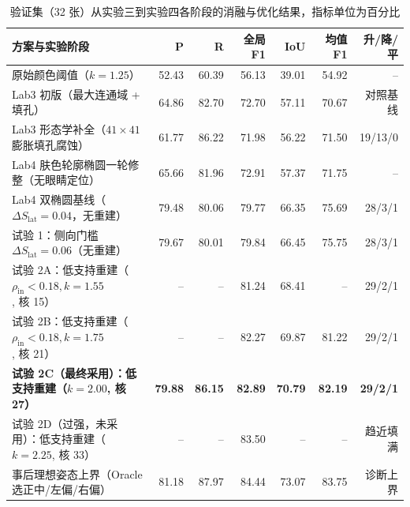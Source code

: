 \begin{table}[H]
\centering\footnotesize
\setlength{\tabcolsep}{3pt}
\caption{验证集（32 张）从实验三到实验四各阶段的消融与优化结果，指标单位为百分比}\label{tab:lab4_ablation}
\begin{tabular}{lrrrrrr}
\toprule
方案与实验阶段 & P & R & 全局 F1 & IoU & 均值 F1 & 升/降/平 \\
\midrule
原始颜色阈值（$k=1.25$） & 52.43 & 60.39 & 56.13 & 39.01 & 54.92 & -- \\
Lab3 初版（最大连通域 + 填孔） & 64.86 & 82.70 & 72.70 & 57.11 & 70.67 & 对照基线 \\
Lab3 形态学补全（$41\times41$ 膨胀填孔腐蚀） & 61.77 & 86.22 & 71.98 & 56.22 & 71.50 & 19/13/0 \\
Lab4 肤色轮廓椭圆一轮修整（无眼睛定位） & 65.66 & 81.96 & 72.91 & 57.37 & 71.75 & -- \\
Lab4 双椭圆基线（$\Delta S_{\text{lat}}=0.04$，无重建） & 79.48 & 80.06 & 79.77 & 66.35 & 75.69 & 28/3/1 \\
试验 1：侧向门槛 $\Delta S_{\text{lat}}=0.06$（无重建） & 79.67 & 80.01 & 79.84 & 66.45 & 75.75 & 28/3/1 \\
试验 2A：低支持重建（$\rho_{\text{in}}<0.18, k=1.55$, 核 15） & -- & -- & 81.24 & 68.41 & -- & 29/2/1 \\
试验 2B：低支持重建（$\rho_{\text{in}}<0.18, k=1.75$, 核 21） & -- & -- & 82.27 & 69.87 & 81.22 & 29/2/1 \\
\textbf{试验 2C（最终采用）：低支持重建（$k=2.00$, 核 27）} & \textbf{79.88} & \textbf{86.15} & \textbf{82.89} & \textbf{70.79} & \textbf{82.19} & \textbf{29/2/1} \\
试验 2D（过强，未采用）：低支持重建（$k=2.25$, 核 33） & -- & -- & 83.50 & -- & -- & 趋近填满 \\
事后理想姿态上界（Oracle 选正中/左偏/右偏） & 81.18 & 87.97 & 84.44 & 73.07 & 83.75 & 诊断上界 \\
\bottomrule
\end{tabular}
\end{table}

